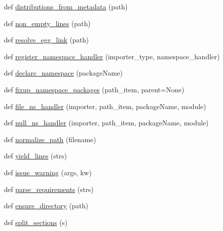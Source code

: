 \begin{DoxyCompactItemize}
def \hyperlink{namespacepip_1_1__vendor_1_1pkg__resources_a27b4990c4dcfc81b97cad629ae53ebb1}{distributions\+\_\+from\+\_\+metadata} (path)
\item 
def \hyperlink{namespacepip_1_1__vendor_1_1pkg__resources_a29953f63b3b46343345df0e126dd3b1f}{non\+\_\+empty\+\_\+lines} (path)
\item 
def \hyperlink{namespacepip_1_1__vendor_1_1pkg__resources_a6788447ac6b0b1b785fe2c7dbd0dd45b}{resolve\+\_\+egg\+\_\+link} (path)
\item 
def \hyperlink{namespacepip_1_1__vendor_1_1pkg__resources_aa03be37380c727d1599bfd637181056e}{register\+\_\+namespace\+\_\+handler} (importer\+\_\+type, namespace\+\_\+handler)
\item 
def \hyperlink{namespacepip_1_1__vendor_1_1pkg__resources_a49c145737085dcb078a6d33c508f816c}{declare\+\_\+namespace} (package\+Name)
\item 
def \hyperlink{namespacepip_1_1__vendor_1_1pkg__resources_a742383e33a0a8dd1ad27c0d0c014a00a}{fixup\+\_\+namespace\+\_\+packages} (path\+\_\+item, parent=None)
\item 
def \hyperlink{namespacepip_1_1__vendor_1_1pkg__resources_ad9ea4af0c123ef5cdf9a04ee41307d49}{file\+\_\+ns\+\_\+handler} (importer, path\+\_\+item, package\+Name, module)
\item 
def \hyperlink{namespacepip_1_1__vendor_1_1pkg__resources_ae56700a9a3eeed5e8101221d1bbaa7b3}{null\+\_\+ns\+\_\+handler} (importer, path\+\_\+item, package\+Name, module)
\item 
def \hyperlink{namespacepip_1_1__vendor_1_1pkg__resources_aa9dddd90aef02ed75eb5e6f02feb8418}{normalize\+\_\+path} (filename)
\item 
def \hyperlink{namespacepip_1_1__vendor_1_1pkg__resources_a9154cf7836eab6cbeb1238fdc578e0fd}{yield\+\_\+lines} (strs)
\item 
def \hyperlink{namespacepip_1_1__vendor_1_1pkg__resources_ad9f0c6a743f176a2909c699e9b5b3747}{issue\+\_\+warning} (args, kw)
\item 
def \hyperlink{namespacepip_1_1__vendor_1_1pkg__resources_acfa8d95bd782ff75e70ae61c11441bc8}{parse\+\_\+requirements} (strs)
\item 
def \hyperlink{namespacepip_1_1__vendor_1_1pkg__resources_a41a609a1febb0a7e86c3dc55772f4169}{ensure\+\_\+directory} (path)
\item 
def \hyperlink{namespacepip_1_1__vendor_1_1pkg__resources_a587a6806a8e8733d0114c374864c9143}{split\+\_\+sections} (s)
\end{DoxyCompactItemize}
